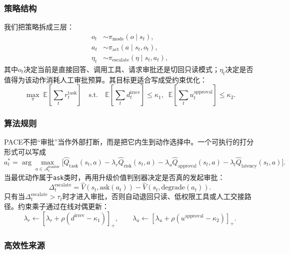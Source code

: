 \documentclass[12pt,a4paper]{article}
\begin{document}
\subsubsection{策略结构}

我们把策略拆成三层：
\begin{align}
o_t &\sim \pi_{\text{mode}}(o\mid s_t), \\
a_t &\sim \pi_{\text{act}}(a\mid s_t,o_t), \\
\eta_t &\sim \pi_{\text{escalate}}(\eta\mid s_t,a_t),
\end{align}
其中$o_t$决定当前是直接回答、调用工具、请求审批还是切回只读模式；$\eta_t$决定是否值得为该动作消耗人工审批预算。其目标更适合写成受约束优化：
\begin{equation}
\max_{\pi}\;\mathbb{E}\left[\sum_t r^{\text{task}}_t\right]
\quad
\text{s.t.}\quad
\mathbb{E}\left[\sum_t d^{\text{irrev}}_t\right]\le \kappa_1,\;\;
\mathbb{E}\left[\sum_t u^{\text{approval}}_t\right]\le \kappa_2.
\end{equation}

\subsubsection{算法规则}

PACE不把“审批”当作外部打断，而是把它内生到动作选择中。一个可执行的打分形式可以写成
\begin{equation}
a_t^*
=
\arg\max_{a \in \mathcal{A}_t^{\text{feasible}}}
\Big[
\hat{Q}_{\text{task}}(s_t,a)
- \lambda_r \hat{Q}_{\text{risk}}(s_t,a)
- \lambda_u \hat{Q}_{\text{approval}}(s_t,a)
- \lambda_l \hat{Q}_{\text{latency}}(s_t,a)
\Big].
\end{equation}
当最优动作属于\texttt{ask}类时，再用升级价值判别器决定是否真的发起审批：
\begin{equation}
\Delta^{\text{escalate}}_t
=
\hat{V}(s_t,\text{ask}(a_t))
-
\hat{V}(s_t,\text{degrade}(a_t)).
\end{equation}
只有当$\Delta^{\text{escalate}}_t > \tau_t$时才进入审批，否则自动退回只读、低权限工具或人工交接路径。约束乘子通过在线对偶更新：
\begin{equation}
\lambda_r \leftarrow [\lambda_r + \rho(d^{\text{irrev}}-\kappa_1)]_+,\qquad
\lambda_u \leftarrow [\lambda_u + \rho(u^{\text{approval}}-\kappa_2)]_+.
\end{equation}

\subsubsection{高效性来源}
\end{document}
